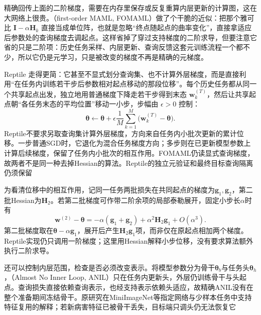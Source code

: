 精确回传上面的二阶梯度，需要在内存里保存或反复重算内层更新的计算图，这在大网络上很贵。（first-order MAML, FOMAML）做了个干脆的近似：把那个雅可比 $\bm I-\alpha\bm H_k$ 直接当成单位阵，也就是忽略“终点随起点的曲率变化”，直接拿适应后参数处的查询梯度去调起点。这样省掉了穿过支持梯度的二阶求导，但要注意它省的只是二阶项：历史任务采样、内层更新、查询反馈这套元训练流程一个都不少，所以它仍是元学习，只是被改变的梯度不再是精确的元梯度。

Reptile 走得更简：它甚至不显式划分查询集、也不计算外层梯度，而是直接利用“在任务内训练若干步后参数相对起点移动的那段位移”。每个历史任务都从同一个共享起点出发，独立地用普通梯度下降走若干步得到末态 $\bm w_k^{(T)}$，然后让共享起点朝“各任务末态的平均位置”移动一小步，步幅由 $\epsilon>0$ 控制：
\begin{equation}
  \bm{\theta}\leftarrow\bm{\theta}
   +\epsilon\frac1M\sum_{k=1}^{M}
        \bigl(\bm w_k^{(T)}-\bm{\theta}\bigr).
  \label{eq:ket-transfer-reptile}
\end{equation}
Reptile不要求另取查询集计算外层梯度，方向来自任务内小批次更新的累计位移。一步普通SGD时，它退化为混合任务梯度方向；多步则在已更新模型参数上计算后续梯度，保留了任务内小批次的相互作用。FOMAML仍读显式查询梯度，故两者不是同一种去掉Hessian的算法。Reptile的独立元验证和最终目标查询隔离仍须保留

为看清位移中的相互作用，记同一任务两批损失在共同起点的梯度为$\bm g_1,\bm g_2$，第二批Hessian为$\bm H_2$。若第二批梯度可作带二阶余项的局部泰勒展开，固定小步长$\alpha$时有
\[
  \bm w^{(2)}-\bm{\theta}
    =-\alpha(\bm g_1+\bm g_2)
      +\alpha^2\bm H_2\bm g_1+O(\alpha^3).
\]
第二批梯度取在$\bm\theta-\alpha\bm g_1$，展开后产生$\bm H_2\bm g_1$项，而非仅在原起点相加两个梯度。Reptile实现仍只调用一阶梯度；这里用Hessian解释小步位移，没有要求算法额外执行二阶求导。

还可以控制内层范围，检查是否必须改变表示。将模型参数分为骨干$\bm\theta_b$与任务头$\bm\theta_h$，（Almost No Inner Loop, ANIL）只在任务内更新头，外层仍训练骨干与头起点。查询损失直接依赖查询表示，也经支持表示依赖头适应，故精确ANIL没有在整个准备期间冻结骨干。原研究在MiniImageNet等指定网络与少样本任务中支持特征复用的解释；若新病害特征已被骨干丢失，目标端只调头仍无法恢复它

